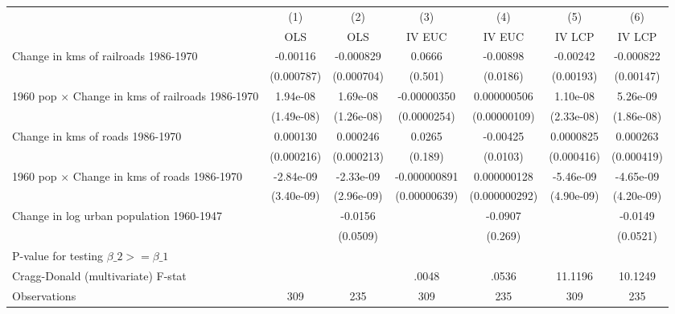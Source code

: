 {
\def\sym#1{\ifmmode^{#1}\else\(^{#1}\)\fi}
\begin{tabular}{l*{6}{c}}
\hline\hline
                &\multicolumn{1}{c}{(1)}&\multicolumn{1}{c}{(2)}&\multicolumn{1}{c}{(3)}&\multicolumn{1}{c}{(4)}&\multicolumn{1}{c}{(5)}&\multicolumn{1}{c}{(6)}\\
                &\multicolumn{1}{c}{OLS}&\multicolumn{1}{c}{OLS}&\multicolumn{1}{c}{IV EUC}&\multicolumn{1}{c}{IV EUC}&\multicolumn{1}{c}{IV LCP}&\multicolumn{1}{c}{IV LCP}\\
\hline
Change in kms of railroads 1986-1970& -0.00116         &-0.000829         &   0.0666         & -0.00898         & -0.00242         &-0.000822         \\
                &(0.000787)         &(0.000704)         &  (0.501)         & (0.0186)         &(0.00193)         &(0.00147)         \\
[1em]
1960 pop $\times$ Change in kms of railroads 1986-1970& 1.94e-08         & 1.69e-08         &-0.00000350         &0.000000506         & 1.10e-08         & 5.26e-09         \\
                &(1.49e-08)         &(1.26e-08)         &(0.0000254)         &(0.00000109)         &(2.33e-08)         &(1.86e-08)         \\
[1em]
Change in kms of roads 1986-1970& 0.000130         & 0.000246         &   0.0265         & -0.00425         &0.0000825         & 0.000263         \\
                &(0.000216)         &(0.000213)         &  (0.189)         & (0.0103)         &(0.000416)         &(0.000419)         \\
[1em]
1960 pop $\times$ Change in kms of roads 1986-1970&-2.84e-09         &-2.33e-09         &-0.000000891         &0.000000128         &-5.46e-09         &-4.65e-09         \\
                &(3.40e-09)         &(2.96e-09)         &(0.00000639)         &(0.000000292)         &(4.90e-09)         &(4.20e-09)         \\
[1em]
Change in log urban population 1960-1947&                  &  -0.0156         &                  &  -0.0907         &                  &  -0.0149         \\
                &                  & (0.0509)         &                  &  (0.269)         &                  & (0.0521)         \\
\hline
P-value for testing $\beta\_{2} >= \beta\_{1}$&                  &                  &                  &                  &                  &                  \\
Cragg-Donald (multivariate) F-stat&                  &                  &    .0048         &    .0536         &  11.1196         &  10.1249         \\
Observations    &      309         &      235         &      309         &      235         &      309         &      235         \\
\hline\hline
\end{tabular}
}
